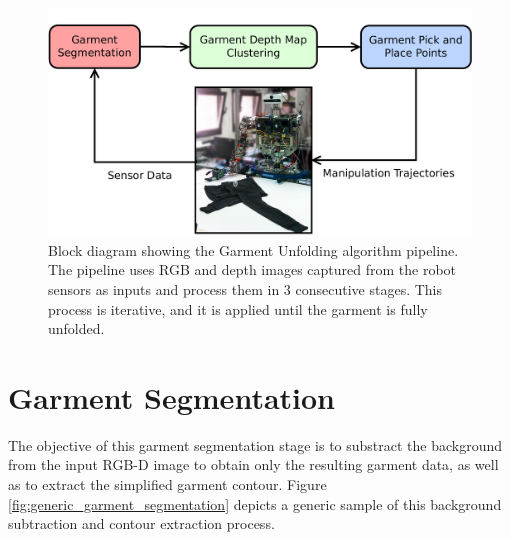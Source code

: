 \begin{figure}[thpb]
    \centering
    \includegraphics[width=\textwidth]
    {figures/Main_diagram.pdf}
    \caption{Block diagram showing the Garment Unfolding algorithm  pipeline. The pipeline uses RGB and depth images captured from the robot sensors as inputs and process them in 3 consecutive stages. This process is iterative, and it is applied until the garment is fully unfolded.}
    \label{fig:pipeline_block_diagram}
\end{figure}

\section{Garment Segmentation}
\label{architecture:garment_segmentation}

The objective of this garment segmentation stage is to substract the background from the input RGB-D image to obtain only the resulting garment data, as well as to extract the simplified garment contour. Figure \ref{fig:generic_garment_segmentation} depicts a generic sample of this background subtraction and contour extraction process.




